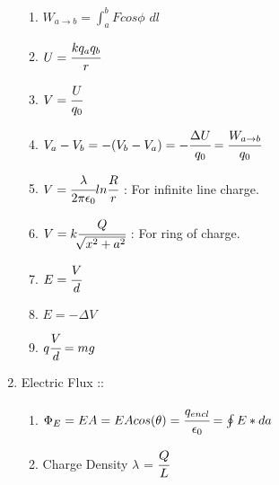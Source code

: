 \documentclass[12pt]{article}
\begin{document}
\begin{enumerate}
\begin{enumerate}
		\item[] $W_{a \rightarrow b} = \int_a^b Fcos\phi$ $dl$
		\item[] $U = \cfrac{kq_aq_b}{r}$	
		\item[] $V = \cfrac{U}{q_0}$
		\item[] $V_a - V_b = -(V_b - V_a) = -\cfrac{\Delta U}{q_0} = \cfrac{W_{a \rightarrow b}}{q_0}$
		\item[] $V = \cfrac{\lambda}{2\pi \epsilon_0}ln\cfrac{R}{r}$ : For infinite line charge.
		\item[] $V = k\cfrac{Q}{\sqrt[]{x^2 + a^2}}$ : For ring of charge.
		\item[] $E = \cfrac{V}{d}$
		\item[] $E = -\Delta V$
		\item[] $q\cfrac{V}{d} = mg$ \\
	\end{enumerate}
	\item[] Electric Flux :: 
	\begin{enumerate}
		\item[] $\Phi_E = EA = EAcos(\theta) = \cfrac{q_{encl}}{\epsilon_0} = \oint E*da$
		\item[] Charge Density $\lambda$ = $\cfrac{Q}{L}$
	\end{enumerate}

\end{enumerate}
\end{document}
